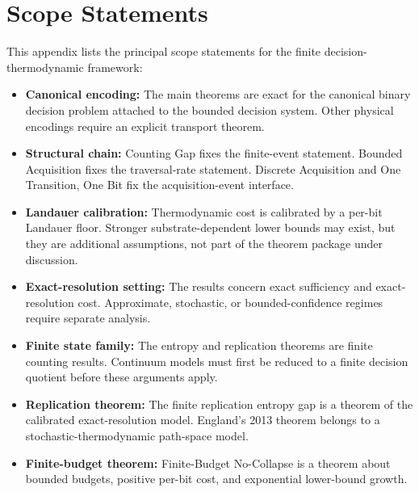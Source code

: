 \section{Scope Statements}\label{appendix-assumptions}

This appendix lists the principal scope statements for the finite decision-thermodynamic framework:

\begin{itemize}
	\item \textbf{Canonical encoding:} The main theorems are exact for the canonical binary decision problem attached to the bounded decision system. Other physical encodings require an explicit transport theorem.
	\item \textbf{Structural chain:} Counting Gap fixes the finite-event statement. Bounded Acquisition fixes the traversal-rate statement. Discrete Acquisition and One Transition, One Bit fix the acquisition-event interface.
	\item \textbf{Landauer calibration:} Thermodynamic cost is calibrated by a per-bit Landauer floor. Stronger substrate-dependent lower bounds may exist, but they are additional assumptions, not part of the theorem package under discussion.
	\item \textbf{Exact-resolution setting:} The results concern exact sufficiency and exact-resolution cost. Approximate, stochastic, or bounded-confidence regimes require separate analysis.
	\item \textbf{Finite state family:} The entropy and replication theorems are finite counting results. Continuum models must first be reduced to a finite decision quotient before these arguments apply.
	\item \textbf{Replication theorem:} The finite replication entropy gap is a theorem of the calibrated exact-resolution model. England's 2013 theorem belongs to a stochastic-thermodynamic path-space model.
	\item \textbf{Finite-budget theorem:} Finite-Budget No-Collapse is a theorem about bounded budgets, positive per-bit cost, and exponential lower-bound growth.
\end{itemize}
